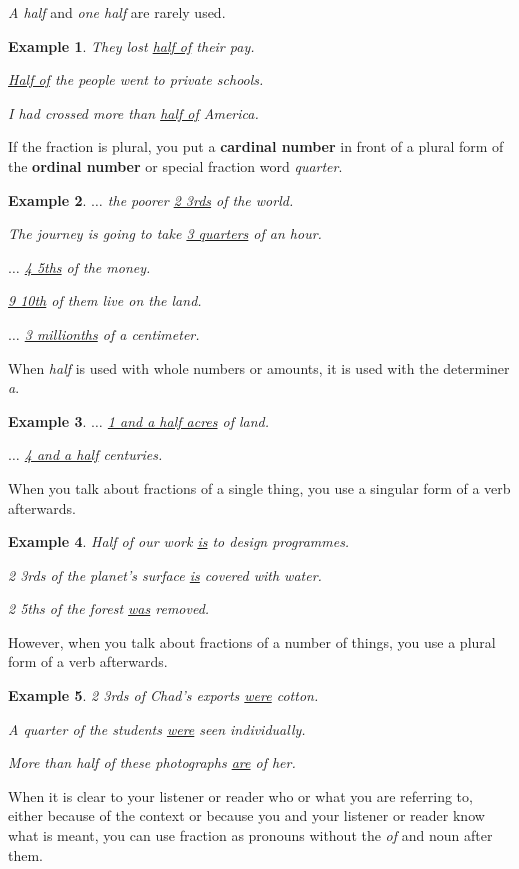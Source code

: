 \documentclass[oneside]{book}
\numberwithin{equation}{section}
\newtheorem{example}{Example}[section]
\begin{document}
\textit{A half} and \textit{one half} are rarely used.
\begin{example}
    They lost \underline{half of} their pay.
    
    \underline{Half of} the people went to private schools.
    
    I had crossed more than \underline{half of} America.
\end{example}
%
\noindent{} If the fraction is plural, you put a \textbf{cardinal number} in front of a plural form of the \textbf{ordinal number} or special fraction word \textit{quarter}.
\begin{example}
    $\ldots$ the poorer \underline{2 3rds} of the world.
    
    The journey is going to take \underline{3 quarters} of an hour.
    
    $\ldots$ \underline{4 5ths} of the money.
    
    \underline{9 10th} of them live on the land.
    
    $\ldots$ \underline{3 millionths} of a centimeter.
\end{example}
When \textit{half} is used with whole numbers or amounts, it is used with the determiner \textit{a}.
\begin{example}
    $\ldots$ \underline{1 and a half acres} of land.
    
    $\ldots$ \underline{4 and a half} centuries.
\end{example}
%
\noindent{} When you talk about fractions of a single thing, you use a singular form of a verb afterwards.
\begin{example}
    Half of our work \underline{is} to design programmes.
    
    2 3rds of the planet's surface \underline{is} covered with water.
    
    2 5ths of the forest \underline{was} removed.
\end{example}
However, when you talk about fractions of a number of things, you use a plural form of a verb afterwards.
\begin{example}
    2 3rds of Chad's exports \underline{were} cotton.
    
    A quarter of the students \underline{were} seen individually.
    
    More than half of these photographs \underline{are} of her.
\end{example}
%
\noindent{} When it is clear to your listener or reader who or what you are referring to, either because of the context or because you and your listener or reader know what is meant, you can use fraction as pronouns without the \textit{of} and noun after them.
\end{document}
